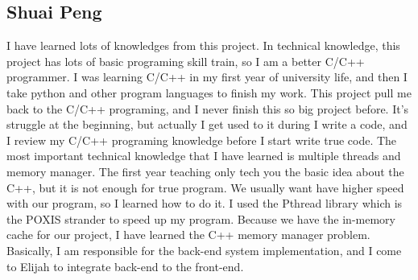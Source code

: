 
\subsection{Shuai Peng}
I have learned lots of knowledges from this project.
In technical knowledge, this project has lots of basic programing skill train, so I am a better C/C++ programmer. 
I was learning C/C++ in my first year of university life, and then I take python and other program languages to finish my work. 
This project pull me back to the C/C++ programing, and I never finish this so big project before.
It's struggle at the beginning, but actually I get used to it during I write a code, and I review my C/C++ programing knowledge before I start write true code.
The most important technical knowledge that I have learned is multiple threads and memory manager.
The first year teaching only tech you the basic idea about the C++, but it is not enough for true program.
We usually want have higher speed with our program, so I learned how to do it.
I used the Pthread library which is the POXIS strander to speed up my program.
Because we have the in-memory cache for our project, I have learned the C++ memory manager problem.
Basically, I am responsible for the back-end system implementation, and I come to Elijah to integrate back-end to the front-end.


